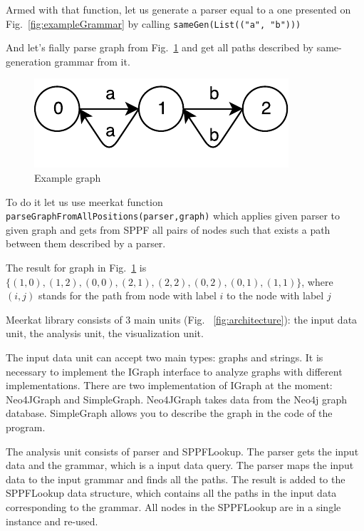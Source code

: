 Armed with that function, let us generate a parser equal to a one presented on Fig.~\ref{fig:exampleGrammar} by calling \lstinline{sameGen(List(("a", "b")))}

And let's fially parse graph from Fig.~\ref{fig:graph} and get all paths described by same-generation grammar from it.

\begin{figure}[h]
\includegraphics{graph}
\caption{Example graph}
\label{fig:graph}
\end{figure}

To do it let us use meerkat function \lstinline{parseGraphFromAllPositions(parser,graph)} which applies given parser to given graph and gets from SPPF all pairs of nodes such that exists a path between them described by a parser.

The result for graph in Fig.~\ref{fig:graph} is $\{(1,0), (1,2), (0,0), (2,1), (2,2), (0,2), (0,1), (1,1)\}$, where $(i,j)$ stands for the path from node with label $i$ to the node with label $j$

Meerkat library consists of 3 main units (Fig. ~\ref{fig:architecture}): the input data unit, the analysis unit, the visualization unit.

The input data unit can accept two main types: graphs and strings. It is necessary to implement the IGraph interface to analyze graphs with different implementations. There are two implementation of IGraph at the moment: Neo4JGraph and SimpleGraph. Neo4JGraph takes data from the Neo4j graph database. SimpleGraph allows you to describe the graph in the code of the program.

The analysis unit consists of parser and SPPFLookup. The parser gets the input data and the grammar, which is a input data query.  The parser maps the input data to the input grammar and finds all the paths. The result is added to the SPPFLookup data structure, which contains all the paths in the input data corresponding to the grammar. All nodes in the SPPFLookup are in a single instance and re-used.

